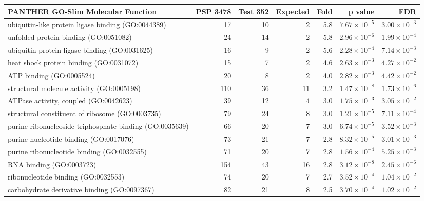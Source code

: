 \begin{table}[ht]
\centering
\begin{adjustbox}{width=\textwidth}
\begin{tabular}{lrrrrrr}
  \hline
PANTHER GO-Slim Molecular Function & PSP 3478 & Test 352 & Expected & Fold & p value & FDR \\ 
  \hline
ubiquitin-like protein ligase binding (GO:0044389) & 17 & 10 & 2 & 5.8 & $7.67 \times 10^{-5}$ & $3.00 \times 10^{-3}$ \\ 
  unfolded protein binding (GO:0051082) & 24 & 14 & 2 & 5.8 & $2.96 \times 10^{-6}$ & $1.99 \times 10^{-4}$ \\ 
  ubiquitin protein ligase binding (GO:0031625) & 16 & 9 & 2 & 5.6 & $2.28 \times 10^{-4}$ & $7.14 \times 10^{-3}$ \\ 
  heat shock protein binding (GO:0031072) & 15 & 7 & 2 & 4.6 & $2.63 \times 10^{-3}$ & $4.27 \times 10^{-2}$ \\ 
  ATP binding (GO:0005524) & 20 & 8 & 2 & 4.0 & $2.82 \times 10^{-3}$ & $4.42 \times 10^{-2}$ \\ 
  structural molecule activity (GO:0005198) & 110 & 36 & 11 & 3.2 & $1.47 \times 10^{-8}$ & $1.73 \times 10^{-6}$ \\ 
  ATPase activity, coupled (GO:0042623) & 39 & 12 & 4 & 3.0 & $1.75 \times 10^{-3}$ & $3.05 \times 10^{-2}$ \\ 
  structural constituent of ribosome (GO:0003735) & 79 & 24 & 8 & 3.0 & $1.21 \times 10^{-5}$ & $7.11 \times 10^{-4}$ \\ 
  purine ribonucleoside triphosphate binding (GO:0035639) & 66 & 20 & 7 & 3.0 & $6.74 \times 10^{-5}$ & $3.52 \times 10^{-3}$ \\ 
  purine nucleotide binding (GO:0017076) & 73 & 21 & 7 & 2.8 & $8.32 \times 10^{-5}$ & $3.01 \times 10^{-3}$ \\ 
  purine ribonucleotide binding (GO:0032555) & 71 & 20 & 7 & 2.8 & $1.56 \times 10^{-4}$ & $5.25 \times 10^{-3}$ \\ 
  RNA binding (GO:0003723) & 154 & 43 & 16 & 2.8 & $3.12 \times 10^{-8}$ & $2.45 \times 10^{-6}$ \\ 
  ribonucleotide binding (GO:0032553) & 74 & 20 & 7 & 2.7 & $3.52 \times 10^{-4}$ & $1.04 \times 10^{-2}$ \\ 
  carbohydrate derivative binding (GO:0097367) & 82 & 21 & 8 & 2.5 & $3.70 \times 10^{-4}$ & $1.02 \times 10^{-2}$ \\ 

\end{tabular}
\end{adjustbox}
\end{table}
